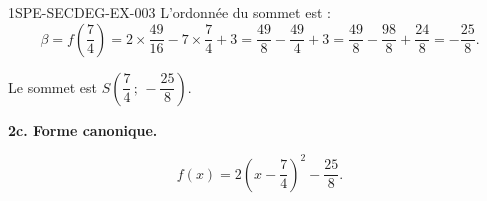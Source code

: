 \begin{corrige}{1SPE-SECDEG-EX-003}
L'ordonnée du sommet est :
\[\beta = f\!\left(\frac{7}{4}\right) = 2\times\frac{49}{16} - 7\times\frac{7}{4} + 3 = \frac{49}{8} - \frac{49}{4} + 3 = \frac{49}{8} - \frac{98}{8} + \frac{24}{8} = -\frac{25}{8}.\]

Le sommet est $S\!\left(\dfrac{7}{4}\,;\,-\dfrac{25}{8}\right)$.

\medskip
\textbf{2c. Forme canonique.}


\[\boxed{f(x) = 2\left(x - \frac{7}{4}\right)^2 - \frac{25}{8}.}\]

\end{corrige}
